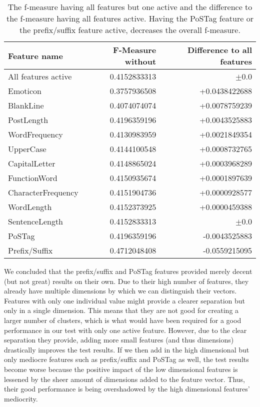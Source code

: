 \begin{table}[ht!]
	\begin{center}
    \begin{tabular}{l|r|r}
	Feature name		& F-Measure without & Difference to all features \\ \hline \hline
	All features active	& 0.4152833313 & $\pm$0.0 \\ \hline \hline
	Emoticon			& 0.3757936508 & +0.0438422688 \\ \hline
	BlankLine			& 0.4074074074 & +0.0078759239 \\ \hline
	PostLength			& 0.4196359196 & +0.0043525883 \\ \hline
	WordFrequency		& 0.4130983959 & +0.0021849354 \\ \hline
	UpperCase			& 0.4144100548 & +0.0008732765 \\ \hline
	CapitalLetter		& 0.4148865024 & +0.0003968289 \\ \hline
	FunctionWord		& 0.4150935674 & +0.0001897639 \\ \hline
	CharacterFrequency	& 0.4151904736 & +0.0000928577 \\ \hline
	WordLength			& 0.4152373925 & +0.0000459388 \\ \hline
	SentenceLength		& 0.4152833313 & $\pm$0.0 	   \\ \hline
	PoSTag				& 0.4196359196 & -0.0043525883 \\ \hline
	Prefix/Suffix		& 0.4712048408 & -0.0559215095 \\
    \end{tabular}
    \end{center}
	\caption{The f-measure having all features but one active and the difference to the f-measure having all features active. Having the PoSTag feature or the prefix/suffix feature active, decreases the overall f-measure.}
	\label{tab:feature_evaluation_1}
\end{table}

We concluded that the prefix/suffix and PoSTag features provided merely decent (but not great) results on their own.
Due to their high number of features, they already have multiple dimensions by which we can distinguish their vectors.
Features with only one individual value might provide a clearer separation but only in a single dimension.
This means that they are not good for creating a larger number of clusters, which is what would have been required for a good performance in our test with only one active feature.
However, due to the clear separation they provide, adding more small features (and thus dimensions) drastically improves the test results.
If we then add in the high dimensional but only mediocre features such as prefix/suffix and PoSTag as well, the test results become worse because the positive impact of the low dimensional features is lessened by the sheer amount of dimensions added to the feature vector.
Thus, their good performance is being overshadowed by the high dimensional features' mediocrity.


